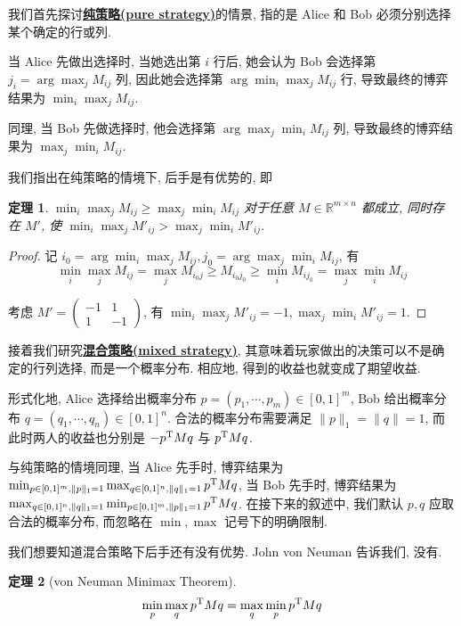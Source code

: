 \documentclass[8pt]{article}
\theoremstyle{compact}
\newtheorem{theorem}{定理}[section]
\def\obj#1{\textbf{\uline{#1}}}
\def\ge{\geqslant}
\begin{document}
我们首先探讨\obj{纯策略(pure strategy)}的情景, 指的是 Alice 和 Bob 必须分别选择某个确定的行或列.

当 Alice 先做出选择时, 当她选出第 $i$ 行后, 她会认为 Bob 会选择第 $j_i = \arg\max_{j}M_{ij}$ 列, 因此她会选择第 $\arg\min_i\max_jM_{ij}$ 行, 导致最终的博弈结果为 $\min_i\max_jM_{ij}$.

同理, 当 Bob 先做选择时, 他会选择第 $\arg\max_j\min_iM_{ij}$ 列, 导致最终的博弈结果为 $\max_j\min_iM_{ij}$.

我们指出在纯策略的情境下, 后手是有优势的, 即

\begin{theorem}
	$\min_i\max_jM_{ij} \ge \max_j\min_iM_{ij}$ 对于任意 $M \in \mathbb R^{m \times n}$ 都成立, 同时存在 $M'$, 使 $\min_i\max_j{M'}_{ij} > \max_j\min_i{M'}_{ij}$.	
\end{theorem}
\begin{proof}
	记 $i_0 = \arg\min_i\max_jM_{ij}, j_0 = \arg\max_j\min_iM_{ij}$, 有 $$\min_i\max_jM_{ij} = \max_jM_{i_0j} \ge M_{i_0j_0} \ge \min_iM_{ij_0} = \max_j\min_iM_{ij}$$

	考虑 $M' = \begin{pmatrix}
		-1 & 1 \\ 1 & -1
	\end{pmatrix}$, 有 $\min_i\max_j{M'}_{ij} = -1, \max_j\min_i{M'}_{ij} = 1$.
\end{proof}

接着我们研究\obj{混合策略(mixed strategy)}, 其意味着玩家做出的决策可以不是确定的行列选择, 而是一个概率分布. 相应地, 得到的收益也就变成了期望收益.

形式化地, Alice 选择给出概率分布 $p = (p_1, \cdots, p_m) \in [0, 1]^m$, Bob 给出概率分布 $q = (q_1, \cdots, q_n) \in [0, 1]^n$. 合法的概率分布需要满足 $\|p\|_1 = \|q\| = 1$, 而此时两人的收益也分别是 $-p^{\text T}Mq$ 与 $p^{\text T}Mq$.

与纯策略的情境同理, 当 Alice 先手时, 博弈结果为 $\min_{p \in [0, 1]^m, \|p\|_1 = 1}\max_{q \in [0, 1]^n, \|q\|_1 = 1} p^{\text T}Mq$, 当 Bob 先手时, 博弈结果为 $\max_{q \in [0, 1]^n, \|q\|_1 = 1}\min_{p \in [0, 1]^m, \|p\|_1 = 1} p^{\text T}Mq$. 在接下来的叙述中, 我们默认 $p, q$ 应取合法的概率分布, 而忽略在 $\min, \max$ 记号下的明确限制.

我们想要知道混合策略下后手还有没有优势. John von Neuman 告诉我们, 没有.

\begin{theorem}[von Neuman Minimax Theorem]
	$$\min_{ p}\max_{ q}  p^{\text T}M q = \max_{ q}\min_{ p}  p^{\text T}M q$$
	\label{minimax}
\end{theorem}
\end{document}
